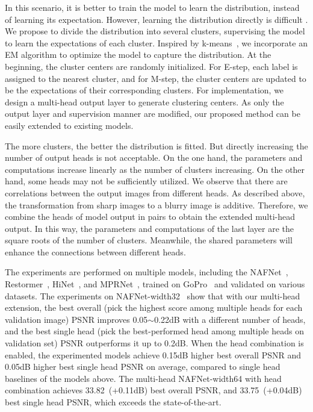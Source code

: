 \documentclass[letterpaper]{article} \usepackage{aaai23}  \usepackage{times}  \usepackage{helvet}  \usepackage{courier}  \usepackage[hyphens]{url}  \usepackage{graphicx} \urlstyle{rm} \def\UrlFont{\rm}  \usepackage{natbib}  \usepackage{caption} \frenchspacing  \setlength{\pdfpagewidth}{8.5in} \setlength{\pdfpageheight}{11in} \usepackage{algorithm}
\begin{document}
In this scenario, it is better to train the model to learn the distribution, instead of learning its expectation. However, learning the distribution directly is difficult \cite{kingma2013vae}. We propose to divide the distribution into several clusters, supervising the model to learn the expectations of each cluster. Inspired by k-means~\cite{lloyd1982least}, we incorporate an EM algorithm to optimize the model to capture the distribution. At the beginning, the cluster centers are randomly initialized. For E-step, each label is assigned to the nearest cluster, and for M-step, the cluster centers are updated to be the expectations of their corresponding clusters. For implementation, we design a multi-head output layer to generate clustering centers. As only the output layer and supervision manner are modified, our proposed method can be easily extended to existing models.

The more clusters, the better the distribution is fitted. But directly increasing the number of output heads is not acceptable. On the one hand, the parameters and computations increase linearly as the number of clusters increasing. On the other hand, some heads may not be sufficiently utilized. We observe that there are correlations between the output images from different heads. As described above, the transformation from sharp images to a blurry image is additive. Therefore, we combine the heads of model output in pairs to obtain the extended multi-head output. In this way, the parameters and computations of the last layer are the square roots of the number of clusters. Meanwhile, the shared parameters will enhance the connections between different heads.





The experiments are performed on multiple models, including the NAFNet~\cite{chen2022simple}, Restormer~\cite{zamir2022restormer}, HiNet~\cite{chen2021hinet}, and MPRNet~\cite{zamir2021multi}, trained on GoPro~\cite{Nah_2017_CVPR} and validated on various datasets. The experiments on NAFNet-width32~\cite{chen2022simple} show that with our multi-head extension, the best overall (pick the highest score among multiple heads for each validation image) PSNR improves 0.05$\sim$0.22dB with a different number of heads, and the best single head (pick the best-performed head among multiple heads on validation set) PSNR outperforms it up to 0.2dB. When the head combination is enabled, the experimented models achieve 0.15dB higher best overall PSNR and 0.05dB higher best single head PSNR on average, compared to single head baselines of the models above. The multi-head NAFNet-width64 with head combination achieves 33.82~(+0.11dB) best overall PSNR, and 33.75~(+0.04dB) best single head PSNR, which exceeds the state-of-the-art.
\end{document}
